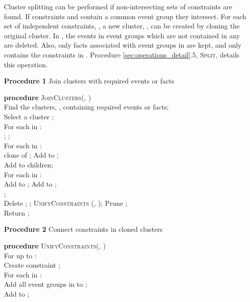 Cluster splitting can be performed if non-intersecting sets of constraints are found. If constraints  and  contain a common event group they intersect. For each set of independent constraints, , a new cluster, , can be created by cloning the original cluster. In , the events in event groups which are not contained in any  are deleted. Also, only facts associated with event groups in  are kept, and  only contains the constraints in . Procedure \ref{sec:operations_detail}.5, \textsc{Split}, details this operation.

\vspace{-5mm}
\begin{snippet}
\textbf{Procedure 1} Join clusters with required events or facts\\  \hline

\textbf{procedure} \textsc{JoinClusters(, )}\\
Find the clusters, , containing required events or facts;\\
Select a cluster ;\\
For each  in :\\
\tab ; ;\\
\tab For each  in :\\
\tab \tab  clone of ; Add  to ;\\
\tab \tab Add  to  children;\\
\tab \tab For each  in :\\
\tab \tab \tab Add  to ; Add  to ;\\
\tab \tab \tab ;\\
\tab Delete ; ; \textsc{UnifyConstraints} (, ); Prune ;\\
Return ;\\
\end{snippet}

\procedurespace
\begin{snippet}
\textbf{Procedure 2} Connect constraints in cloned clusters\\ \hline

\textbf{procedure} \textsc{UnifyConstraints(, )}\\
For  up to :\\
\tab Create constraint ;\\
\tab For each  in :\\
\tab \tab Add all event groups in  to ;\\
\tab Add  to ;\\
\end{snippet}

